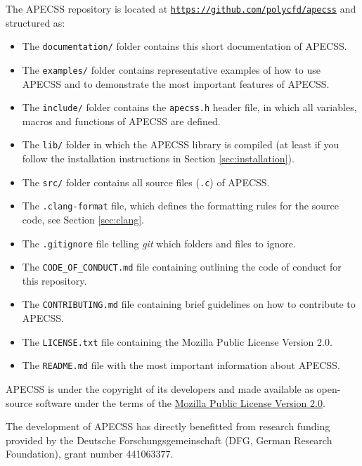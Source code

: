 The APECSS repository is located at \href{https://github.com/polycfd/apecss}{\texttt{https://github.com/polycfd/apecss}} and structured as:\vspace{-1em}
\begin{itemize}[noitemsep]
    \item The {\tt documentation/} folder contains this short documentation of APECSS.
    \item The {\tt examples/} folder contains representative examples of how to use APECSS and to demonstrate the most important features of APECSS. 
    \item The {\tt include/} folder contains the {\tt apecss.h} header file, in which all variables, macros and functions of APECSS are defined.
    \item The {\tt lib/} folder in which the APECSS library is compiled (at least if you follow the installation instructions in Section \ref{sec:installation}).
    \item The {\tt src/} folder contains all source files ({\tt *.c}) of APECSS.
    \item The {\tt .clang-format} file, which defines the formatting rules for the source code, see Section \ref{sec:clang}.
    \item The {\tt .gitignore} file telling \textit{git} which folders and files to ignore.
    \item The {\tt CODE\_OF\_CONDUCT.md} file containing outlining the code of conduct for this repository.
    \item The {\tt CONTRIBUTING.md} file containing brief guidelines on how to contribute to APECSS.
    \item The {\tt LICENSE.txt} file containing the Mozilla Public License Version 2.0.
    \item The {\tt README.md} file with the most important information about APECSS.
\end{itemize}

APECSS is under the copyright of its developers and made available as open-source software under the terms of the \href{https://www.mozilla.org/en-US/MPL/2.0/}{Mozilla Public License Version 2.0}.

The development of APECSS has directly benefitted from research funding provided by the Deutsche Forschungsgemeinschaft (DFG, German Research Foundation), grant number 441063377.
